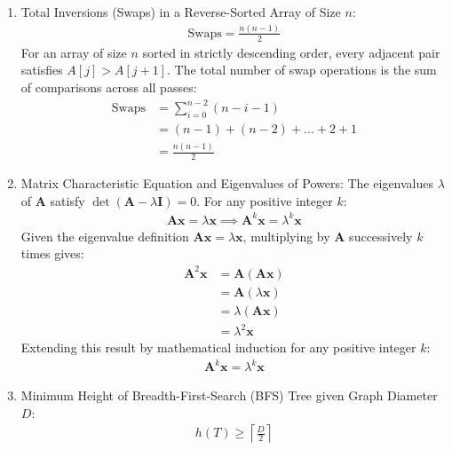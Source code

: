 \begin{enumerate}[label=\thesubsection.\arabic*, ref=\thesubsection.\theenumi, itemsep=0.5cm]
\item Total Inversions (Swaps) in a Reverse-Sorted Array of Size $n$:
\begin{align}
\text{Swaps} = \frac{n(n-1)}{2} \label{eq:CS12025-bubble_sort_swaps}
\end{align}
\solution
For an array of size $n$ sorted in strictly descending order, every adjacent pair satisfies $A[j] > A[j+1]$. The total number of swap operations is the sum of comparisons across all passes:
\begin{align}
\text{Swaps} &= \sum_{i=0}^{n-2} (n - i - 1) \\
             &= (n - 1) + (n - 2) + \dots + 2 + 1 \\
             &= \frac{n(n-1)}{2}
\end{align}

\item Matrix Characteristic Equation and Eigenvalues of Powers:
The eigenvalues $\lambda$ of $\mathbf{A}$ satisfy $\det(\mathbf{A} - \lambda \mathbf{I}) = 0$. For any positive integer $k$:
\begin{align}
\mathbf{A}\mathbf{x} = \lambda \mathbf{x} \implies \mathbf{A}^k \mathbf{x} = \lambda^k \mathbf{x} \label{eq:CS12025-eigenvalue_power}
\end{align}
\solution
Given the eigenvalue definition $\mathbf{A}\mathbf{x} = \lambda \mathbf{x}$, multiplying by $\mathbf{A}$ successively $k$ times gives:
\begin{align}
\mathbf{A}^2 \mathbf{x} &= \mathbf{A}(\mathbf{A}\mathbf{x}) \\
                        &= \mathbf{A}(\lambda \mathbf{x}) \\
                        &= \lambda (\mathbf{A}\mathbf{x}) \\
                        &= \lambda^2 \mathbf{x}
\end{align}
Extending this result by mathematical induction for any positive integer $k$:
\begin{align}
\mathbf{A}^k \mathbf{x} = \lambda^k \mathbf{x}
\end{align}

\item Minimum Height of Breadth-First-Search (BFS) Tree given Graph Diameter $D$:
\begin{align}
h(T) \ge \left\lceil \frac{D}{2} \right\rceil \label{eq:CS12025-bfs_tree_height}
\end{align}


\end{enumerate}
